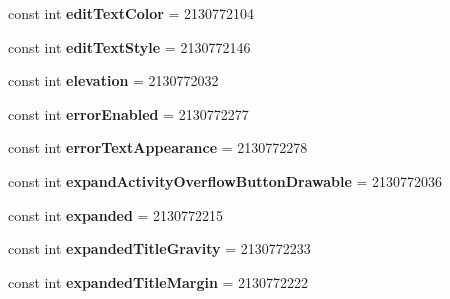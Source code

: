 \begin{DoxyCompactItemize}
const int {\bfseries edit\+Text\+Color} = 2130772104
\item 
\mbox{\label{class_sample_app_1_1_droid_1_1_resource_1_1_attribute_ad7bb5760e7936731fd76463c76162cee}} 
const int {\bfseries edit\+Text\+Style} = 2130772146
\item 
\mbox{\label{class_sample_app_1_1_droid_1_1_resource_1_1_attribute_a69a3ff2b158dee4abf5cc0d3b7a0ce2b}} 
const int {\bfseries elevation} = 2130772032
\item 
\mbox{\label{class_sample_app_1_1_droid_1_1_resource_1_1_attribute_a47ddd7fb70a427a12715c64b8ef7920a}} 
const int {\bfseries error\+Enabled} = 2130772277
\item 
\mbox{\label{class_sample_app_1_1_droid_1_1_resource_1_1_attribute_a55934b0f0f08388a481795af8c71391e}} 
const int {\bfseries error\+Text\+Appearance} = 2130772278
\item 
\mbox{\label{class_sample_app_1_1_droid_1_1_resource_1_1_attribute_a1b1f7f01a0383413260026cdb9cfb74f}} 
const int {\bfseries expand\+Activity\+Overflow\+Button\+Drawable} = 2130772036
\item 
\mbox{\label{class_sample_app_1_1_droid_1_1_resource_1_1_attribute_a287edc7c9851ed9358833faf0e19ab52}} 
const int {\bfseries expanded} = 2130772215
\item 
\mbox{\label{class_sample_app_1_1_droid_1_1_resource_1_1_attribute_a21f0e48937afd658bcb3014fd7d84d75}} 
const int {\bfseries expanded\+Title\+Gravity} = 2130772233
\item 
\mbox{\label{class_sample_app_1_1_droid_1_1_resource_1_1_attribute_afc7d98dba5348785910dc7d8333e4e17}} 
const int {\bfseries expanded\+Title\+Margin} = 2130772222
\item 
\mbox{\label{class_sample_app_1_1_droid_1_1_resource_1_1_attribute_ab6effe756d1713b25a0093904df72afc}} 

\end{DoxyCompactItemize}
